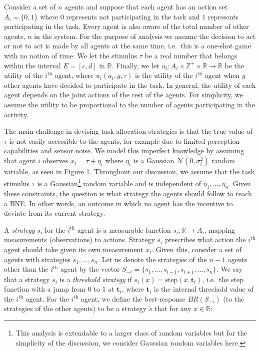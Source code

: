 \documentclass[12pt]{article}
\def\Z{\mathbb{Z}}    %
\def\R{\mathbb{R}}    %
\def\td{\mathbf{t}}   %
\begin{document}
Consider a set of $n$ agents and suppose that each agent has an action set $A_i=\{0,1\}$ where $0$ represents not participating in the task and $1$ represents participating in the task. Every agent is also aware of the total number of other agents, $n$ in the system. For the purpose of analysis we assume the decision to act or not to act is made by all agents at the same time, i.e.\ this is a one-shot game with no notion of time. We let the stimulus $\tau$ be a real number that belongs within the interval $E=[c,d]$ in $\R$. Finally, we let $u_i:A_i\times\Z^+\times \R\to \R$ be the utility of the $i^{\text{th}}$ agent, where $u_i(a_i,g,\tau)$ is the utility of the $i^{\text{th}}$ agent when $g$ other agents have decided to participate in the task. In general, the utility of each agent depends on the joint actions of the rest of the agents. For simplicity, we assume the utility to be proportional to the number of agents participating in the activity. %

The main challenge in devising task allocation strategies is that the true value of $\tau$ is not easily accessible to the agents, for example due to limited perception capabilities and sensor noise.
We model this imperfect knowledge by assuming that agent $i$ observes $x_i=\tau+\eta_i$ where $\eta_i$ is a Gaussian $\mathcal{N}(0,\sigma_i^2)$ random variable, as seen in Figure 1. Throughout our discussion, we assume that the task stimulus $\tau$ is a Gaussian\footnote{This analysis is extendable to a larger class of random variables but for the simplicity of the discussion, we consider Gaussian random variables here.} random variable and is independent of $\eta_1,\ldots,\eta_n$.  Given these constraints, the question is what strategy the agents should follow to reach a BNE. In other words, an outcome in which no agent has the incentive to deviate from its current strategy.

A \emph{strategy} $s_i$ for the $i^{\text{th}}$ agent is a measurable function $s_i:\R\to A_i$, mapping measurements (observations) to actions. Strategy $s_i$ prescribes what action the $i^{\text{th}}$ agent should take given its own measurement $x_i$. Given this, consider a set of agents with strategies $s_1,\ldots,s_n$. Let us denote the strategies of the $n-1$ agents other than the $i^{\text{th}}$ agent by the vector $S_{-i}=\{s_1,\ldots,s_{i-1},s_{i+1},\ldots,s_n\}$.  We say that a strategy $s_i$ is a \emph{threshold strategy} if $s_i(x)=\text{step}(x, \td_i)$, i.e.\ the step function with a jump from $0$ to $1$ at $\td_i$, where $\td_i$ is the internal threshold value of the $i^{\text{th}}$ agent. For the $i^{\text{th}}$ agent, we define the best-response $BR(S_{-i})$ (to the strategies of the other agents) to be a strategy $\tilde{s}$ that for any $x\in \R$:
\end{document}
